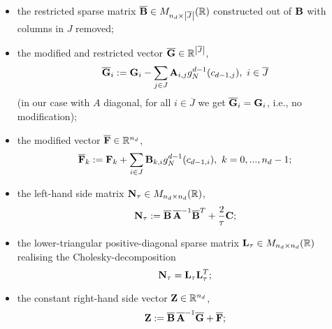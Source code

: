 \begin{algorithm}
\begin{enumerate}
\begin{itemize}
          the restricted diagonal matrix
          $\overline{\bf A} \in
            M_{\abs{\overline{J}} \times \abs{\overline{J}}}(\R)$
          constructed out of ${\bf A}$ with rows and columns in $J$ removed;
        \item
          the restricted sparse matrix
          $\overline{\bf B} \in M_{n_d \times \left\lvert\overline{J}\right\rvert}(\mathbb{R})$
          constructed out of ${\bf B}$ with columns in $J$ removed;
        \item
          the modified and restricted vector
          $\overline{\bf G} \in \mathbb{R}^{\left\lvert\overline{J}\right\rvert}$,
          \begin{equation}
            \overline{\bf G}_i :=
            {\bf G}_i
            - \sum_{j \in J} {\bf A}_{i, j} g_N^{d - 1}(c_{d - 1, j}),\
            i \in \overline{J}
          \end{equation}
          (in our case with $A$ diagonal, for all $i \in \overline{J}$ we get
          $\overline{\bf G}_i = {\bf G}_i$, i.e., no modification);
        \item
          the modified vector $\overline{\bf F} \in \mathbb{R}^{n_d}$,
          \begin{equation}
            \overline{\bf F}_k
            := {\bf F}_k
              + \sum_{i \in J} {\bf B}_{k, i} g_N^{d - 1}(c_{d - 1, i}),\
            k = 0, ..., n_d - 1;
          \end{equation}
        \item
          the left-hand side matrix ${\bf N}_\tau \in M_{n_d \times n_d}(\mathbb{R})$,
          \begin{equation}
            {\bf N}_\tau
            := \overline{\bf B}\, \overline{\bf A}^{-1} \overline{\bf B}^T
              + \frac{2}{\tau} {\bf C};
          \end{equation}
        \item
          the lower-triangular positive-diagonal sparse matrix
          ${\bf L}_\tau \in M_{n_d \times n_d}(\mathbb{R})$
          realising the Cholesky-decomposition
          \begin{equation}
            {\bf N}_\tau = {\bf L}_\tau {\bf L}^T_\tau;
          \end{equation}
        \item
          the constant right-hand side vector ${\bf Z} \in \mathbb{R}^{n_d}$,
          \begin{equation}
            {\bf Z}
            := \overline{\bf B}\, \overline{\bf A}^{-1} \overline{\bf G}
              + \overline{\bf F};
          \end{equation}

\end{itemize}
\end{enumerate}
\end{algorithm}
